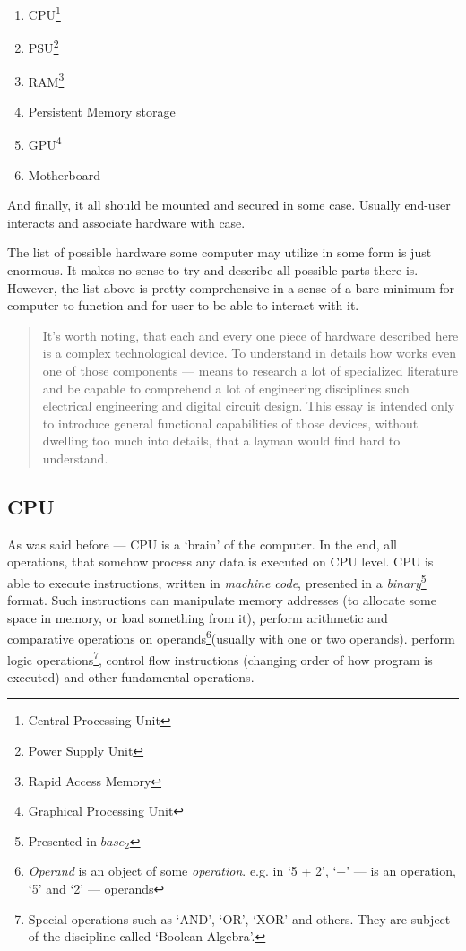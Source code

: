 \documentclass[../../what-is-computer.tex]{subfiles}
\begin{document}
    \begin{enumerate}
        \item CPU\footnote{Central Processing Unit}
        \item PSU\footnote{Power Supply Unit}
        \item RAM\footnote{Rapid Access Memory}
        \item Persistent Memory storage
        \item GPU\footnote{Graphical Processing Unit}
        \item Motherboard
    \end{enumerate}
    And finally, it all should be mounted and secured in some case. Usually end-user interacts and associate hardware with case. \par

    The list of possible hardware some computer may utilize in some form is just enormous. It makes no sense to try and describe all possible parts there is.
    However, the list above is pretty comprehensive in a sense of a bare minimum for computer to function and for user to be able to interact with it. \par

    \begin{quote}
        It's worth noting, that each and every one piece of hardware described here is a complex technological device. To understand in details how works even
        one of those components --- means to research a lot of specialized literature and be capable to comprehend a lot of engineering disciplines such 
        electrical engineering and digital circuit design. This essay is intended only to introduce general functional capabilities of those devices, without
        dwelling too much into details, that a layman would find hard to understand.
    \end{quote}

    \subsection{CPU}

    As was said before --- CPU is a `brain' of the computer. In the end, all operations, that somehow process any data is executed on CPU level. CPU is able to
    execute instructions, written in \emph{machine code}, presented in a \emph{binary}\footnote{Presented in $base_2$} format. Such instructions can manipulate
    memory addresses (to allocate some space in memory, or load something from it), perform arithmetic and comparative operations on 
    operands\footnote{\emph{Operand} is an object of some \emph{operation}. e.g. in `5 + 2', `+' --- is an operation, `5' and `2' --- operands}(usually with one or two operands).
    perform logic operations\footnote{Special operations such as `AND', `OR', `XOR' and others. They are subject of the discipline called `Boolean Algebra'.}, control
    flow instructions (changing order of how program is executed) and other fundamental operations. \par
\end{document}
